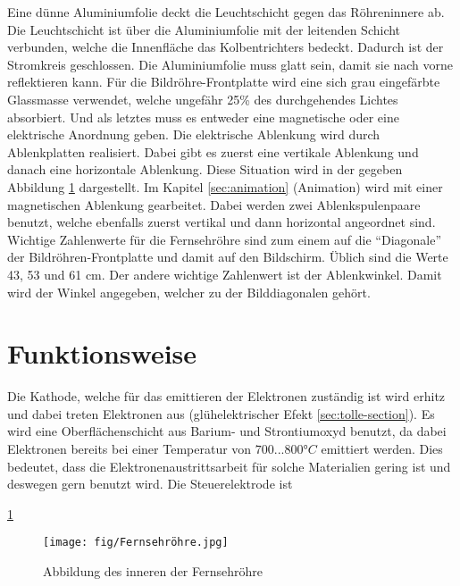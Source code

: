 Eine dünne Aluminiumfolie deckt die Leuchtschicht gegen das Röhreninnere ab.
Die Leuchtschicht ist über die Aluminiumfolie mit der leitenden Schicht verbunden, welche die Innenfläche das Kolbentrichters bedeckt.
Dadurch ist der Stromkreis geschlossen.
Die Aluminiumfolie muss glatt sein, damit sie nach vorne reflektieren kann.
Für die Bildröhre-Frontplatte wird eine sich grau eingefärbte Glassmasse verwendet, welche ungefähr 25\% des durchgehendes Lichtes absorbiert.
Und als letztes muss es entweder eine magnetische oder eine elektrische Anordnung geben.
Die elektrische Ablenkung wird durch Ablenkplatten realisiert.
Dabei gibt es zuerst eine vertikale Ablenkung und danach eine horizontale Ablenkung.
Diese Situation wird in der gegeben Abbildung \ref{fig:Fernsehroehre} dargestellt.
Im Kapitel \ref{sec:animation} (Animation) wird mit einer magnetischen Ablenkung gearbeitet.
Dabei werden zwei Ablenkspulenpaare benutzt, welche ebenfalls zuerst vertikal und dann horizontal angeordnet sind.
Wichtige Zahlenwerte für die Fernsehröhre sind zum einem auf die "`Diagonale"' der Bildröhren-Frontplatte und damit auf den Bildschirm.
Üblich sind die Werte 43, 53 und 61 cm.
Der andere wichtige Zahlenwert ist der Ablenkwinkel.
Damit wird der Winkel angegeben, welcher zu der Bilddiagonalen gehört.

\section{Funktionsweise}
Die Kathode, welche für das emittieren der Elektronen zuständig ist wird erhitz und dabei treten Elektronen aus (glühelektrischer Efekt \ref{sec:tolle-section}).
Es wird eine Oberflächenschicht aus Barium- und Strontiumoxyd benutzt, da  dabei Elektronen bereits bei einer Temperatur von $700...800°C$ emittiert werden.
Dies bedeutet, dass die Elektronenaustrittsarbeit für solche Materialien gering ist und deswegen gern benutzt wird.
Die Steuerelektrode ist 

\ref{fig:Fernsehroehre} \cite{Abbildung}
\cite{Fernsehroehre}
\cite{Roehrenfernsehr}
\begin{figure}
    \centering
    \texttt{[image: fig/Fernsehröhre.jpg]}
    \caption{Abbildung des inneren der Fernsehröhre}
    \label{fig:Fernsehroehre}
\end{figure}
